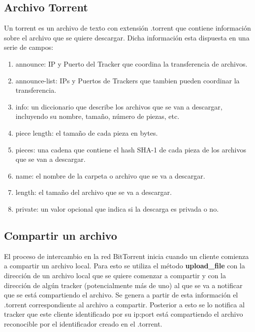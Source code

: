 \documentclass[article]{llncs}
\begin{document}
\subsection{Archivo Torrent}
Un torrent es un archivo de texto con extensi\'on .torrent que contiene informaci\'on sobre el archivo 
que se quiere descargar. Dicha informaci\'on esta dispuesta en una serie de campos:

\begin{enumerate}
  \item announce: IP y Puerto del Tracker que coordina la transferencia de archivos.
  \item announce-list: IPs y Puertos de Trackers que tambien pueden coordinar la transferencia.
  \item info: un diccionario que describe los archivos que se van a descargar, incluyendo su nombre, tamaño, número de piezas, etc.
  \item piece length: el tamaño de cada pieza en bytes.
  \item pieces: una cadena que contiene el hash SHA-1 de cada pieza de los archivos que se van a descargar.
  \item name: el nombre de la carpeta o archivo que se va a descargar.
  \item length: el tamaño del archivo que se va a descargar.
  \item private: un valor opcional que indica si la descarga es privada o no.
\end{enumerate}

\subsection{Compartir un archivo}
El proceso de intercambio en la red BitTorrent inicia cuando un cliente comienza a compartir un archivo local. Para esto se
utiliza el método \textbf{upload\_file} con la dirección de un archivo local que se quiere comenzar a compartir y con la dirección 
de algún tracker (potencialmente más de uno) al que se va a notificar que se está compartiendo el archivo. Se genera a partir de esta información el .torrent 
correspondiente al archivo a compartir. Posterior a esto se lo notifica al tracker que este cliente identificado por su ip:port 
está compartiendo el archivo reconocible por el identificador creado en el .torrent.
\end{document}
